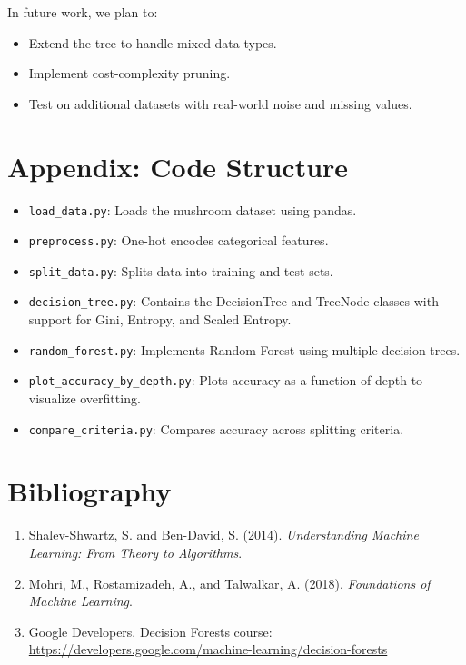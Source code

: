 \documentclass[11pt]{article}
\begin{document}
In future work, we plan to:
\begin{itemize}
    \item Extend the tree to handle mixed data types.
    \item Implement cost-complexity pruning.
    \item Test on additional datasets with real-world noise and missing values.
\end{itemize}

\section{Appendix: Code Structure}
\begin{itemize}
    \item \texttt{load\_data.py}: Loads the mushroom dataset using pandas.
    \item \texttt{preprocess.py}: One-hot encodes categorical features.
    \item \texttt{split\_data.py}: Splits data into training and test sets.
    \item \texttt{decision\_tree.py}: Contains the DecisionTree and TreeNode classes with support for Gini, Entropy, and Scaled Entropy.
    \item \texttt{random\_forest.py}: Implements Random Forest using multiple decision trees.
    \item \texttt{plot\_accuracy\_by\_depth.py}: Plots accuracy as a function of depth to visualize overfitting.
    \item \texttt{compare\_criteria.py}: Compares accuracy across splitting criteria.
\end{itemize}

\section{Bibliography}
\begin{enumerate}
    \item Shalev-Shwartz, S. and Ben-David, S. (2014). \textit{Understanding Machine Learning: From Theory to Algorithms}.
    \item Mohri, M., Rostamizadeh, A., and Talwalkar, A. (2018). \textit{Foundations of Machine Learning}.
    \item Google Developers. Decision Forests course: \url{https://developers.google.com/machine-learning/decision-forests}
\end{enumerate}
\end{document}
